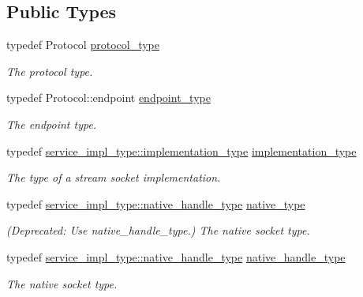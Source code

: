 \subsection*{Public Types}
\begin{DoxyCompactItemize}
\item 
typedef Protocol \hyperlink{classasio_1_1stream__socket__service_ab2ab14d6b8097da11777751e3164ec92}{protocol\+\_\+type}
\begin{DoxyCompactList}\small\item\em The protocol type. \end{DoxyCompactList}\item 
typedef Protocol\+::endpoint \hyperlink{classasio_1_1stream__socket__service_a02567f4db6df303c08c6dadc09e76273}{endpoint\+\_\+type}
\begin{DoxyCompactList}\small\item\em The endpoint type. \end{DoxyCompactList}\item 
typedef \hyperlink{structasio_1_1detail_1_1reactive__socket__service_1_1implementation__type}{service\+\_\+impl\+\_\+type\+::implementation\+\_\+type} \hyperlink{classasio_1_1stream__socket__service_a3e2c55b4aaf6bab6dfa83c8dbf5b236a}{implementation\+\_\+type}
\begin{DoxyCompactList}\small\item\em The type of a stream socket implementation. \end{DoxyCompactList}\item 
typedef \hyperlink{classasio_1_1detail_1_1reactive__socket__service_a2fc869359f3eb7b6f25925f10e594e1d}{service\+\_\+impl\+\_\+type\+::native\+\_\+handle\+\_\+type} \hyperlink{classasio_1_1stream__socket__service_a26842938d909788add79ee91c2e6146c}{native\+\_\+type}
\begin{DoxyCompactList}\small\item\em (Deprecated\+: Use native\+\_\+handle\+\_\+type.) The native socket type. \end{DoxyCompactList}\item 
typedef \hyperlink{classasio_1_1detail_1_1reactive__socket__service_a2fc869359f3eb7b6f25925f10e594e1d}{service\+\_\+impl\+\_\+type\+::native\+\_\+handle\+\_\+type} \hyperlink{classasio_1_1stream__socket__service_a357418641fad207a19bade585d086876}{native\+\_\+handle\+\_\+type}
\begin{DoxyCompactList}\small\item\em The native socket type. \end{DoxyCompactList}\end{DoxyCompactItemize}
